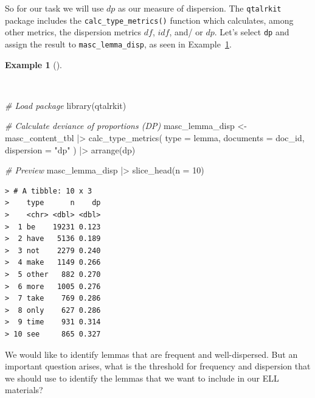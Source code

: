 \documentclass[
  letterpaper,
  DIV=11,
  numbers=noendperiod]{scrreport}
\newenvironment{Shaded}{\begin{snugshade}}{\end{snugshade}}
\newcommand{\AttributeTok}[1]{\textcolor[rgb]{0.00,0.00,0.00}{#1}}
\newcommand{\CommentTok}[1]{\textcolor[rgb]{0.00,0.00,0.00}{\textit{#1}}}
\newcommand{\DecValTok}[1]{\textcolor[rgb]{0.00,0.00,0.00}{#1}}
\newcommand{\FunctionTok}[1]{\textcolor[rgb]{0.00,0.00,0.00}{#1}}
\newcommand{\NormalTok}[1]{\textcolor[rgb]{0.00,0.00,0.00}{#1}}
\newcommand{\OtherTok}[1]{\textcolor[rgb]{0.00,0.00,0.00}{#1}}
\newcommand{\SpecialCharTok}[1]{\textcolor[rgb]{0.00,0.00,0.00}{#1}}
\newcommand{\StringTok}[1]{\textcolor[rgb]{0.00,0.00,0.00}{#1}}
\theoremstyle{definition}
\newtheorem{example}{Example}[chapter]
\theoremstyle{remark}
\begin{document}
So for our task we will use \(dp\) as our measure of dispersion. The
\texttt{qtalrkit} package includes the \texttt{calc\_type\_metrics()}
function which calculates, among other metrics, the dispersion metrics
\(df\), \(idf\), and/ or \(dp\). Let's select \texttt{dp} and assign the
result to \texttt{masc\_lemma\_disp}, as seen in
Example~\ref{exm-eda-masc-dp}.

\begin{example}[]\protect\hypertarget{exm-eda-masc-dp}{}\label{exm-eda-masc-dp}

~

\begin{Shaded}
\begin{Highlighting}[]
\CommentTok{\# Load package}
\FunctionTok{library}\NormalTok{(qtalrkit)}

\CommentTok{\# Calculate deviance of proportions (DP)}
\NormalTok{masc\_lemma\_disp }\OtherTok{\textless{}{-}} 
\NormalTok{  masc\_content\_tbl }\SpecialCharTok{|\textgreater{}} 
  \FunctionTok{calc\_type\_metrics}\NormalTok{(}
    \AttributeTok{type =}\NormalTok{ lemma, }
    \AttributeTok{documents =}\NormalTok{ doc\_id, }
    \AttributeTok{dispersion =} \StringTok{"dp"}
\NormalTok{  ) }\SpecialCharTok{|\textgreater{}} 
  \FunctionTok{arrange}\NormalTok{(dp)}

\CommentTok{\# Preview}
\NormalTok{masc\_lemma\_disp }\SpecialCharTok{|\textgreater{}} 
  \FunctionTok{slice\_head}\NormalTok{(}\AttributeTok{n =} \DecValTok{10}\NormalTok{)}
\end{Highlighting}
\end{Shaded}

\begin{verbatim}
> # A tibble: 10 x 3
>    type      n    dp
>    <chr> <dbl> <dbl>
>  1 be    19231 0.123
>  2 have   5136 0.189
>  3 not    2279 0.240
>  4 make   1149 0.266
>  5 other   882 0.270
>  6 more   1005 0.276
>  7 take    769 0.286
>  8 only    627 0.286
>  9 time    931 0.314
> 10 see     865 0.327
\end{verbatim}

\end{example}

We would like to identify lemmas that are frequent and well-dispersed.
But an important question arises, what is the threshold for frequency
and dispersion that we should use to identify the lemmas that we want to
include in our ELL materials?
\end{document}
